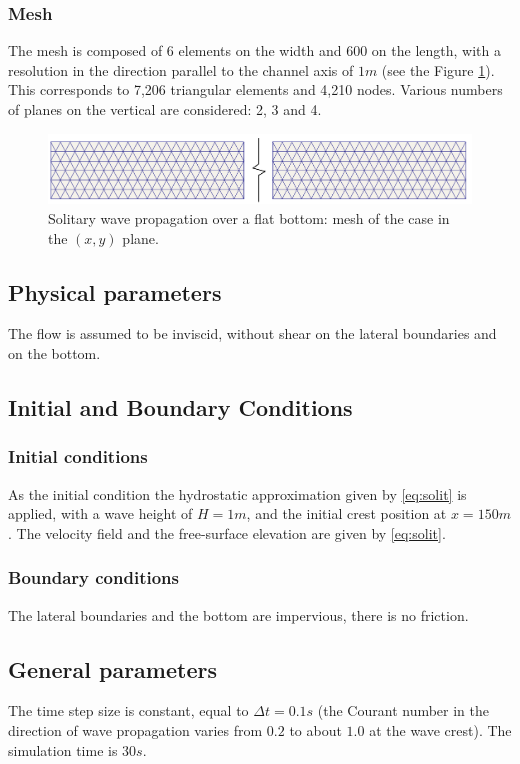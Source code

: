 \subsubsection{Mesh}
The mesh is composed of 6 elements on the width and 600 on the length,
with a resolution in the direction parallel to the channel axis of $1 m$ (see the Figure \ref{fig:solit_mesh}).
This corresponds to 7,206 triangular elements and 4,210 nodes.
Various numbers of planes on the vertical are considered: 2, 3 and 4.
\begin{figure}[H]
\begin{center}
  \includegraphics[scale=0.45]{img/figure2.pdf}
\end{center}
\caption{Solitary wave propagation over a flat bottom: mesh of the case in the $(x,y)$ plane.}
\label{fig:solit_mesh}
\end{figure}

\subsection{Physical parameters}
%
The flow is assumed to be inviscid, without shear on the lateral boundaries and on the bottom.
%
\subsection{Initial and Boundary Conditions}
%
\subsubsection{Initial conditions}
%
As the initial condition the hydrostatic approximation
given by \eqref{eq:solit} is applied, with a wave height of $H = 1 m$,
and the initial crest position at $x = 150 m$. The velocity field and the free-surface
elevation are given by \eqref{eq:solit}.
%
\subsubsection{Boundary conditions}
%
The lateral boundaries and the bottom are impervious, there is no friction.
%
\subsection{General parameters}
%
The time step size is constant, equal to $\Delta t = 0.1 s$ (the Courant number in the direction
of wave propagation varies from $0.2$ to about $1.0$ at the wave crest).
The simulation time is $30 s$.

